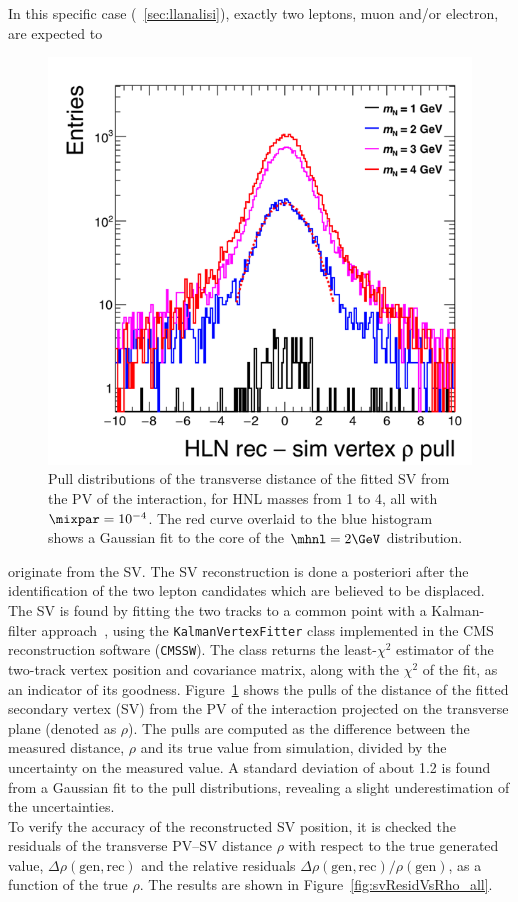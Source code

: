 In this specific case (~\ref{sec:llanalisi}), exactly two leptons, muon and/or electron, are
expected to
\begin{figure}
  \includegraphics[width=.45\textwidth]{Figures/c2/leptons_fromN_fromNW_vtx_rho_pull.png}
  \caption{Pull distributions of the
    transverse distance of the fitted SV from
    the PV of the interaction, for HNL masses from 1 to 4\GeV,
    all with $\mixpar=10^{-4}$. The red curve overlaid to the blue
    histogram shows a Gaussian fit to the core of the $\mhnl=2\GeV$
    distribution. \dani}
  \label{fig:svPulls}
\end{figure} 
 originate from the SV. The SV reconstruction is done a
posteriori after the identification of the two lepton candidates which
are believed to be displaced. \\
The SV is found by fitting the two tracks to a common point with a Kalman-filter
approach~\cite{BILLOIR1990219}, using the \texttt{KalmanVertexFitter}
class implemented in the CMS reconstruction software (\texttt{CMSSW}).
The class returns the least-$\chi^2$ estimator of the two-track vertex
position and covariance matrix, along with the $\chi^2$ of the fit, as
an indicator of its goodness.
Figure~\ref{fig:svPulls} shows the pulls of the distance of the fitted
secondary vertex (SV) from the PV of the interaction projected on the
transverse plane (denoted as $\rho$). The pulls
are computed as the difference between the measured distance, $\rho$
and its true value from simulation, divided by the uncertainty
on the measured value. A standard deviation of about 1.2 is found from
a Gaussian fit to the pull distributions, revealing a slight
underestimation of the uncertainties.\\
To verify the accuracy of the reconstructed SV position, it is checked the residuals of the
transverse PV--SV distance $\rho$ with respect to the true generated
value, $\Delta\rho(\mathrm{gen,rec})$ and the relative residuals
$\Delta\rho(\mathrm{gen,rec})/\rho(\mathrm{gen})$, as a
function of the true $\rho$. The results are shown in
Figure~\ref{fig:svResidVsRho_all}.

